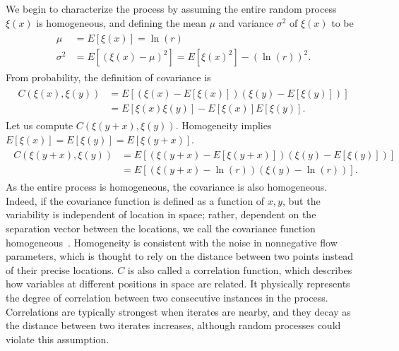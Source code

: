 We begin to characterize the process by
assuming the entire random process $\xi(x)$ is homogeneous, and defining the mean $\mu$ and variance $\sigma^2$
of $\xi(x)$ to be
\begin{align}
\begin{split}\label{ximean}
\mu &= E[\xi(x)] = \ln(r)\\
\sigma^2 &= E[(\xi(x) - \mu)^2]=E[\xi(x)^2]-(\ln(r))^2.
\end{split}
\end{align}
From probability, the definition of covariance is~\cite{ross}
\begin{align*}
\begin{split}
C(\xi(x),\xi(y)) &= E[(\xi(x) - E[\xi(x)])(\xi(y) - E[\xi(y)])]\\
&= E[\xi(x)\xi(y)] - E[\xi(x)]E[\xi(y)].
\end{split}
\end{align*}
Let us compute $C(\xi(y+x),\xi(y))$. Homogeneity implies $E[\xi(x)] =
E[\xi(y)] = E[\xi(y+x)]$.
\begin{align}
\begin{split}\label{cor}
C(\xi(y+x),\xi(y)) &= E[(\xi(y+x) - E[\xi(y+x)])(\xi(y) -
E[\xi(y)])]\\
&= E[(\xi(y+x) -\ln(r))(\xi(y)-\ln(r))]. 
\end{split}
\end{align}
As the entire process is homogeneous, the covariance is also
homogeneous. Indeed, if the covariance function is defined as a function of $x,y$, but the
variability is independent of location in space; rather, dependent on
the separation vector between the locations, we call the covariance
function homogeneous~\cite{gelhar}. Homogeneity is consistent with the
noise in nonnegative flow parameters, which is
thought to rely on the distance between two points instead of their
precise locations. $C$ is also called a correlation function, which
describes how variables at different positions in space are
related. It physically represents the degree of correlation between
two consecutive instances in the process. Correlations are typically strongest
when iterates are nearby, and they decay as the distance
between two iterates increases, although random processes could violate this assumption. 

